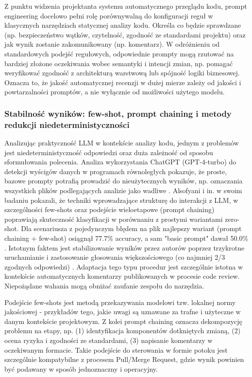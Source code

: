 Z punktu widzenia projektanta systemu automatycznego przeglądu kodu, prompt engineering docelowo pełni rolę porównywalną
do konfiguracji reguł w klasycznych narzędziach statycznej analizy kodu. Określa co będzie sprawdzane (np. bezpieczeństwo
wątków, czytelność, zgodność ze standardami projektu) oraz jak wynik zostanie zakomunikowany (np. komentarz). W odróżnieniu
od standardowych podejść regułowych, odpowiednie prompty mogą rzutować na bardziej złożone oczekiwania wobec semantyki i
intencji zmian, np. pomagać weryfikować zgodność z architekturą warstwową lub spójność logiki biznesowej. Oznacza to, że
jakość automatycznej recenzji w dużej mierze zależy od jakości i powtarzalności promptów, a nie wyłącznie od możliwości
użytego modelu.

\subsubsection{Stabilność wyników: few-shot, prompt chaining i metody redukcji niedeterministyczności}
Analizując praktyczność LLM w kontekście analizy kodu, jednym z problemów jest niedeterministyczność odpowiedzi oraz duża zależność
od sposobu sformułowania polecenia. Analiza wykorzystania ChatGPT (GPT-4-turbo) do detekcji wyścigów danych w
programach równoległych pokazuje, że proste, bazowe prompty potrafią prowadzić do nieużytecznych wyników, np. oznaczania
wszystkich plików podlegających analizie jako wadliwe \cite{alsofyani2025datarace}. Alsofyani i in. w swoim badaniu pokazali, że
techniki wprowadzające strukturę do interakcji z LLM, w szczególności few-shots oraz podejście wieloetapowe (prompt chaining)
poprawiają skuteczność klasyfikacji w porównaniu z prostymi wariantami zero-shot. Dla scenariusza z pojedynczym błędem
na plik najlepszy wariant (prompt chaining + few-shot) osiągnął \mbox{77.7\%} accuracy, a sam "basic prompt" dawał
\mbox{50.0\%} \cite{alsofyani2025datarace}. Istotnym faktem jest stabilizowanie wyników przez autorów poprzez trzykrotne
uruchamianie i zastosowanie głosowania większościowego (co najmniej 2/3 zgodnych odpowiedzi) \cite{alsofyani2025datarace}.
Adaptacja tego typu procedur jest szczególnie istotna w kontekście automatycznych komentarzy publikowanych w procesie code review.
Niepożądane wahania mogą obniżać zaufanie zespołu do narzędzia.

Podejście few-shots jest metodą przekazywania modelowi tzw. lokalnej normy jakościowej - przykładów tego, jakie uwagi
są uznawane za trafne i użyteczne w danym kontekście projektowym. Z kolei prompt chaining oznacza dekompozycję problemu
na etapy, np. (1) identyfikacja komponentów dotkniętych zmianą, (2) ocena ryzyka i zgodności ze standardami, (3) napisanie
komentarzy w oczekiwanym formacie. Takie podejście do sterowania w formie potoku jest szczególnie kompatybilne z procesem
Pull/Merge Request, gdzie wynik powinien być podawany w sposób jednoznaczny i operacyjny.


